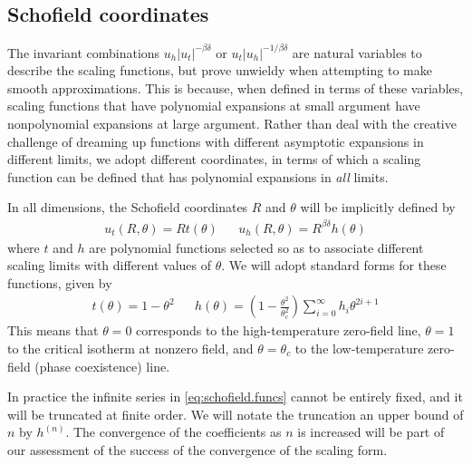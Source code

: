 \documentclass[
  aps,
  pre,
  reprint,
  longbibliography,
  floatfix
]{revtex4-2}
\begin{document}
\cite{Cardy_1985_Conformal}
\cite{Connelly_2020_Universal}
\cite{An_2016_Functional}
\cite{Zambelli_2017_Lee-Yang}
\cite{Gliozzi_2014_Critical}

\subsection{Schofield coordinates}

The invariant combinations $u_h|u_t|^{-\beta\delta}$ or
$u_t|u_h|^{-1/\beta\delta}$ are natural variables to describe the scaling
functions, but prove unwieldy when attempting to make smooth approximations.
This is because, when defined in terms of these variables, scaling functions
that have polynomial expansions at small argument have nonpolynomial expansions
at large argument. Rather than deal with the creative challenge of dreaming up
functions with different asymptotic expansions in different limits, we adopt
different coordinates, in terms of which a scaling function can be defined that
has polynomial expansions in \emph{all} limits.

In all dimensions, the Schofield coordinates $R$ and $\theta$ will be implicitly defined by
\begin{align} \label{eq:schofield}
  u_t(R, \theta) = Rt(\theta)
  &&
  u_h(R, \theta) = R^{\beta\delta}h(\theta)
\end{align}
where $t$ and $h$ are polynomial functions selected so as to associate different scaling limits with different values of $\theta$. We will adopt standard forms for these functions, given by
\begin{align} \label{eq:schofield.funcs}
  t(\theta)=1-\theta^2
  &&
  h(\theta)=\left(1-\frac{\theta^2}{\theta_c^2}\right)\sum_{i=0}^\infty h_i\theta^{2i+1}
\end{align}
This means that $\theta=0$ corresponds to the high-temperature zero-field line,
$\theta=1$ to the critical isotherm at nonzero field, and $\theta=\theta_c$ to
the low-temperature zero-field (phase coexistence) line.

In practice the infinite series in \eqref{eq:schofield.funcs} cannot be
entirely fixed, and it will be truncated at finite order. We will notate the
truncation an upper bound of $n$ by $h^{(n)}$. The convergence of the
coefficients as $n$ is increased will be part of our assessment of the success
of the convergence of the scaling form.
\end{document}
